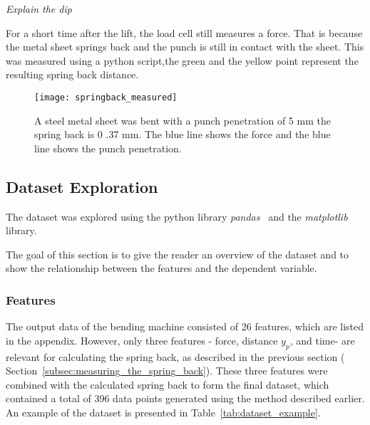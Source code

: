 \textit{Explain the dip}

For a short time after the lift, the load cell still measures a force.
That is because the metal sheet springs back and the punch is still in contact with the
sheet.
This was measured using a python script,the green and the yellow point represent the
resulting spring back distance.

\begin{figure}[H]
    \begin{tcolorbox}[arc=0pt,boxrule=0.5pt]
        \centering
        \texttt{[image: springback\_measured]}
    \end{tcolorbox}
    \caption{A steel metal sheet was bent with a punch penetration of 5
    mm the spring back is 0
    .37 mm. The blue line
    shows the force and the blue line shows the punch penetration.}
    \label{fig:springback_measured}
\end{figure}


\subsection{Dataset Exploration}\label{subsec:dataset-exploration}
The dataset was explored using the python library \textit{pandas}~\cite{mckinney-proc-
scipy-2010} and the
\textit{matplotlib}~\cite{Hunter:2007} library.

The goal of this section is to give the reader an overview of the dataset and
to show the relationship between the features and the dependent variable.

\subsubsection{Features}
The output data of the bending machine consisted of 26 features, which are listed in
the appendix.
However, only three features - force, distance $y_p$, and time- are relevant for
calculating the spring back, as described in the previous section (
Section~\ref{subsec:measuring_the_spring_back}).
These three features were combined with the calculated spring back to form the final
dataset, which contained a total of
396 data points generated using the method described earlier.
An example of the dataset is presented in Table~\ref{tab:dataset_example}.

